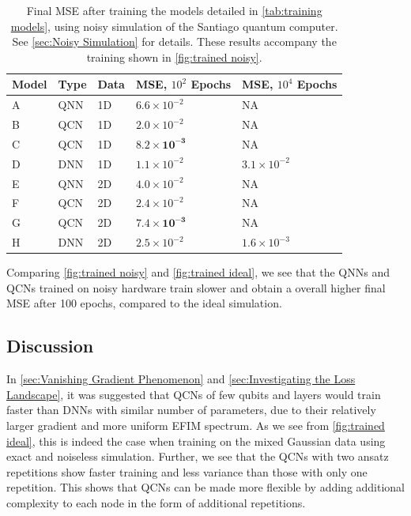 \begin{table}[H]
\centering
\caption{Final MSE after training the models detailed in \autoref{tab:training models}, using noisy simulation of the Santiago quantum computer. See \autoref{sec:Noisy Simulation} for details. These results accompany the training shown in \autoref{fig:trained noisy}.} 
\begin{tabular}{|l|l|l|l|l|}
\hline
Model& Type& Data& MSE, $10^{2}$ Epochs& MSE, $10^{4}$ Epochs \\ \hline
A    & QNN & 1D  & $6.6 \times 10^{-2}$   & NA   \\ \hline
B    & QCN & 1D  & $2.0\times 10^{-2}$  & NA \\ \hline
C    & QCN & 1D  & $\boldsymbol{8.2\times 10^{-3}}$  & NA  \\ \hline
D    & DNN & 1D  & $1.1\times 10^{-2}$ & $3.1\times 10^{-2}$  \\ \Xhline{2\arrayrulewidth}
E    & QNN & 2D  &  $4.0 \times 10^{-2}$                  & NA  \\ \hline
F    & QCN & 2D  &  $2.4\times 10^{-2}$ & NA  \\ \hline
G    & QCN & 2D  &  $\boldsymbol{7.4\times 10^{-3}}$ & NA  \\ \hline
H    & DNN & 2D  &  $2.5\times10^{-2}$ & $1.6\times10^{-3}$\\\hline
\end{tabular}

\label{tab:training models mse noisy}
\end{table}

Comparing \autoref{fig:trained noisy} and \autoref{fig:trained ideal}, we see that the QNNs and QCNs trained on noisy hardware train slower and obtain a overall higher final MSE after 100 epochs, compared to the ideal simulation. 


\subsection{Discussion}\label{sec:Training Discussion}
In \autoref{sec:Vanishing Gradient Phenomenon} and \autoref{sec:Investigating the Loss Landscape}, it was suggested that QCNs of few qubits and layers would train faster than DNNs with similar number of parameters, due to their relatively larger gradient and more uniform EFIM spectrum. As we see from \autoref{fig:trained ideal}, this is indeed the case when training on the mixed Gaussian data using exact and noiseless simulation.
Further, we see that the QCNs with two ansatz repetitions show faster training and less variance than those with only one repetition. This shows that QCNs can be made more flexible by adding additional complexity to each node in the form of additional repetitions. 

